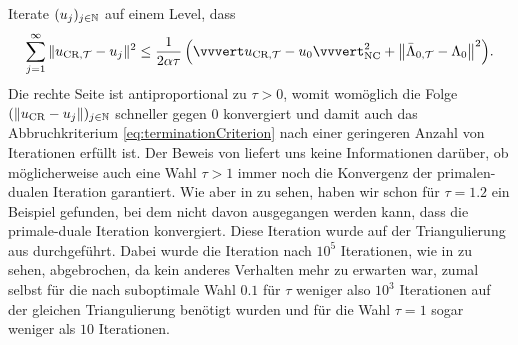 Iterate $(u_j)_{j\in\mathbb{N}}$ auf einem Level, dass
\begin{align}
  \label{eq:nrIterationsInequality}
  \sum_{j=1}^\infty\Vert \ucrt - u_j \Vert^2 
  \leq
  \frac{1}{2\alpha\tau}
  \left(\vvvert \ucrt - u_0\vvvert^2_\nc 
  + \left\Vert \bar\Lambda_{0,\Tcal} - \Lambda_0\right\Vert^2\right)\!. 
\end{align}
Die rechte Seite ist antiproportional zu $\tau>0$, womit womöglich
die Folge $(\left\Vert u_\textup{CR} - u_j\right\Vert)_{j\in\mathbb{N}}$ schneller gegen $0$
konvergiert und damit auch das Abbruchkriterium \eqref{eq:terminationCriterion}
nach einer geringeren Anzahl von Iterationen erfüllt ist. 
Der Beweis von  liefert uns keine
Informationen darüber, ob möglicherweise auch eine Wahl $\tau>1$ immer noch die
Konvergenz der primalen-dualen Iteration garantiert.
Wie aber in  zu sehen, haben wir schon für
$\tau=1.2$ ein Beispiel gefunden, bei dem nicht davon ausgegangen werden kann,
dass die primale-duale Iteration konvergiert.
Diese Iteration wurde auf der Triangulierung aus  
durchgeführt. 
Dabei wurde die Iteration nach $10^5$ Iterationen, wie in
 zu sehen, abgebrochen, da kein anderes
Verhalten mehr zu erwarten war, zumal selbst für die nach
 suboptimale Wahl $0.1$ für $\tau$ weniger also $10^3$
Iterationen auf der gleichen Triangulierung benötigt wurden und für die Wahl
$\tau=1$ sogar weniger als $10$ Iterationen.
